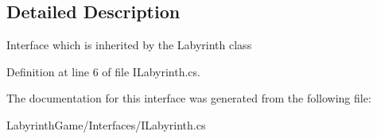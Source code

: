 \subsection{Detailed Description}
Interface which is inherited by the Labyrinth class 



Definition at line 6 of file I\+Labyrinth.\+cs.



The documentation for this interface was generated from the following file\+:\begin{DoxyCompactItemize}
\item 
Labyrinth\+Game/\+Interfaces/I\+Labyrinth.\+cs\end{DoxyCompactItemize}
